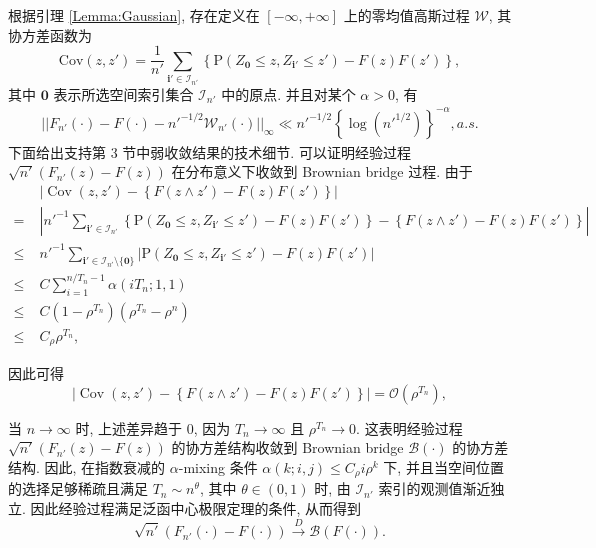 \documentclass[a4paper,openay,14pt]{ctexbook}
\numberwithin{equation}{section}
\numberwithin{lem}{section}
\begin{document}
    根据引理 \ref{Lemma:Gaussian}, 存在定义在 $[-\infty,+\infty]$ 上的零均值高斯过程 $\mathcal{W}$, 其协方差函数为
$$\text{Cov} (z,z')=\frac{1}{n'}\sum_{\mathbf{i}'\in \mathcal{I}_{n'}}\left\{\mathrm{P}\left(Z_{\mathbf{0}}\le z, Z_{\mathbf{i}'}\le z'\right)-F(z)F(z')\right\},$$ 
其中 $\mathbf{0}$ 表示所选空间索引集合 $\mathcal{I}_{n'}$ 中的原点. 并且对某个 $\alpha>0$, 有
\begin{align}
||F_{n'}(\cdot)-F(\cdot)-n'^{-1/2}\mathcal{W}_{n'}(\cdot)||_{\infty}\ll n'^{-1/2}\left\{\log (n'^{1/2})\right\}^{-\alpha},  a.s.  
\label{EQ:gaussianprocess}
\end{align}
下面给出支持第 3 节中弱收敛结果的技术细节. 可以证明经验过程 $\sqrt{n'}(F_{n'}(z) - F(z))$ 在分布意义下收敛到 Brownian bridge 过程. 由于  
\begin{align*}
    &\left| \operatorname{Cov}(z, z') - \left\{F(z \wedge z') - F(z)F(z')\right\} \right| \\
    =\; &\left| n'^{-1} \sum_{\mathbf{i}' \in \mathcal{I}_{n'}} \left\{\mathrm{P}(Z_{\mathbf{0}} \le z, Z_{\mathbf{i}'} \le z') - F(z)F(z')\right\} - \left\{F(z \wedge z') - F(z)F(z')\right\} \right| \\
    \le\; &n'^{-1} \sum_{\mathbf{i}' \in \mathcal{I}_{n'} \setminus \{\mathbf{0}\}} \left| \mathrm{P}(Z_{\mathbf{0}} \le z, Z_{\mathbf{i}'} \le z') - F(z)F(z') \right| \\
    \le\; &C \sum_{i=1}^{n/T_n - 1} \alpha(iT_n; 1, 1) \\
    \le\; &C(1 - \rho^{T_n})(\rho^{T_n} - \rho^n) \\
    \le\; &C_{\rho} \rho^{T_n},
\end{align*}

因此可得
\begin{equation}\label{EQU:cov}
    \left| \operatorname{Cov}(z, z') - \left\{ F(z \wedge z') - F(z)F(z') \right\} \right| = \mathcal{O}(\rho^{T_n}),
\end{equation}

当 $ n \to \infty $ 时, 上述差异趋于 0, 因为 $ T_n \to \infty $ 且 $ \rho^{T_n} \to 0 $. 这表明经验过程 $\sqrt{n'}(F_{n'}(z) - F(z))$ 的协方差结构收敛到 Brownian bridge $\mathcal{B}(\cdot)$ 的协方差结构. 因此, 在指数衰减的 $\alpha$-mixing 条件 $\alpha(k; i, j) \leq C_\rho i \rho^k$ 下, 并且当空间位置的选择足够稀疏且满足 $T_n \sim n^{\theta}$, 其中 $\theta \in (0,1)$ 时, 由 $\mathcal{I}_{n'}$ 索引的观测值渐近独立. 因此经验过程满足泛函中心极限定理的条件, 从而得到
\[
\sqrt{n'}(F_{n'}(\cdot) - F(\cdot)) \overset{D}{\longrightarrow} \mathcal{B}(F(\cdot)).
\]
\end{document}
